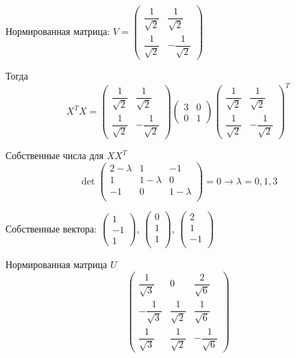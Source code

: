 \documentclass[12pt]{article} %
\theoremstyle{definition} %
\begin{document}
Нормированная матрица:
$V = \begin{pmatrix}
\dfrac{1}{\sqrt{2}} & \dfrac{1}{\sqrt{2}} \\
\dfrac{1}{\sqrt{2}} & -\dfrac{1}{\sqrt{2}} 
\end{pmatrix} $

Тогда 
\[
X^TX = \begin{pmatrix}
\dfrac{1}{\sqrt{2}} & \dfrac{1}{\sqrt{2}} \\
\dfrac{1}{\sqrt{2}} & -\dfrac{1}{\sqrt{2}} 
\end{pmatrix}
\begin{pmatrix}
3 & 0 \\
0 & 1
\end{pmatrix}
\begin{pmatrix}
\dfrac{1}{\sqrt{2}} & \dfrac{1}{\sqrt{2}} \\
\dfrac{1}{\sqrt{2}} & -\dfrac{1}{\sqrt{2}} 
\end{pmatrix}^T
\]

Собственные числа для $XX^T$ 
\[
\det \begin{pmatrix}
2-\lambda & 1 & -1 \\
1& 1-\lambda & 0 \\
-1 & 0 & 1-\lambda \\
\end{pmatrix}=0 \rightarrow \lambda = 0,1,3
\]

Собственные вектора: $\begin{pmatrix}
1 \\
-1 \\
1
\end{pmatrix}$, $\begin{pmatrix}
0 \\
1\\
1\\
\end{pmatrix}$,
$\begin{pmatrix}
2 \\
1\\
-1\\
\end{pmatrix}$

Нормированная матрица $U$
\[
\begin{pmatrix}
\dfrac{1}{\sqrt{3}} & 0 & \dfrac{2}{\sqrt{6}} \\
-\dfrac{1}{\sqrt{3}} & \dfrac{1}{\sqrt{2}} & \dfrac{1}{\sqrt{6}} \\
\dfrac{1}{\sqrt{3}} & \dfrac{1}{\sqrt{2}} & -\dfrac{1}{\sqrt{6}} 
\end{pmatrix}
\]
\end{document}
